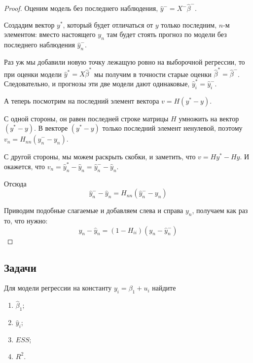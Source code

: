 \documentclass[12pt]{article}
\newcommand{\hb}{\hat{\beta}}
\newcommand{\hy}{\hat{y}}
\newcommand{\ESS}{ESS}
\begin{document}
\begin{proof}
Оценим модель без последнего наблюдения, $\hat y^{-} = X^{-} \hb^{-}$. 

Создадим вектор $y^{*}$, который будет отличаться от $y$ только последним, $n$-м элементом:
вместо настоящего $y_n$ там будет стоять прогноз по модели без последнего наблюдения $\hat y^{-}_n$.

Раз уж мы добавили новую точку лежащую ровно на выборочной регрессии, то при оценки модели
$\hat y^* = X \hat \beta^*$ мы получим в точности старые оценки $\hat \beta^* = \hat \beta^-$. 
Следовательно, и прогнозы эти две модели дают одинаковые, $\hat y_i^* = \hat y_i^-$.

А теперь посмотрим на последний элемент вектора $v = H (y^* - y)$.

С одной стороны, он равен последней строке матрицы $H$ умножить на вектор $(y^* - y)$. 
В векторе $(y^* - y)$ только последний элемент ненулевой, поэтому $v_n = H_{nn} (\hat y^{-}_n - y_n)$.

С другой стороны, мы можем раскрыть скобки, и заметить, что $v = Hy^* - Hy$. 
И окажется, что $v_n = \hat y_n^* - \hat y_n = \hat y_n^- - \hat y_n$.

Отсюда
\[
 \hat y_n^- - \hat y_n = H_{nn} (\hat y_n^- - y_n)
\]

Приводим подобные слагаемые и добавляем слева и справа $y_n$, получаем как раз то, что нужно:
\[
y_n - \hat y_n   = (1 - H_{ii}) (y_n - \hat y_n^- )
\]
\end{proof}


\subsection{Задачи}

\begin{problem}
    Для модели регрессии на константу $y_i = \beta_1 + u_i$ найдите
    \begin{enumerate}
        \item $\hb_1$;
        \item $\hy_i$;
        \item $\ESS$;
        \item $R^2$.
    \end{enumerate}
\end{problem}
\end{document}
